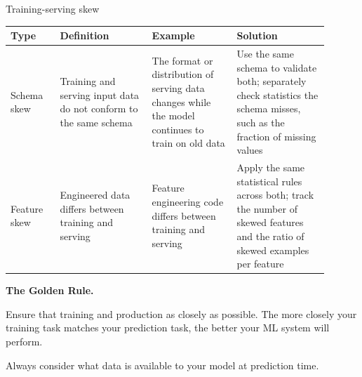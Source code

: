 \begin{frame}{Training-serving skew}
  \begin{withmargin}
    \begin{tdmain}
      \footnotesize
      \begin{tabular}{@{}p{0.14\linewidth}p{0.26\linewidth}p{0.24\linewidth}p{0.26\linewidth}@{}}
        \toprule
        \textbf{Type} & \textbf{Definition} & \textbf{Example} & \textbf{Solution}\\
        \midrule
        Schema skew & Training and serving input data do not conform to the same
          schema & The format or distribution of serving data changes while the
          model continues to train on old data & Use the same schema to validate
          both; separately check statistics the schema misses, such as the
          fraction of missing values\\[0.4em]
        Feature skew & Engineered data differs between training and serving
          & Feature engineering code differs between training and serving
          & Apply the same statistical rules across both; track the number of
          skewed features and the ratio of skewed examples per feature\\
        \bottomrule
      \end{tabular}
    \end{tdmain}
    \begin{tdmargin}
      {\color{tdfg}\textbf{The Golden Rule.}}
      \par\medskip
      Ensure that training and production  as closely as
      possible. The more closely your training task matches your prediction
      task, the better your ML system will perform.
      \par\medskip
      Always consider what data is available to your model at prediction time.
    \end{tdmargin}
  \end{withmargin}
\end{frame}

